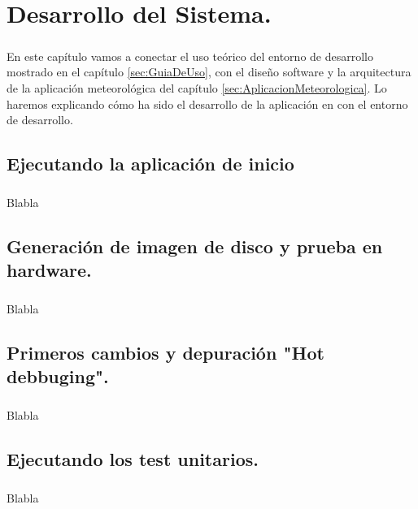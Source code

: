 \chapter{Desarrollo del Sistema.}\label{sec:Desarrollo}

\paragraph{}En este capítulo vamos a conectar el uso teórico del entorno de desarrollo
mostrado en el capítulo \ref{sec:GuiaDeUso}, con el diseño software y la arquitectura de
la aplicación meteorológica del capítulo \ref{sec:AplicacionMeteorologica}. Lo haremos
explicando cómo ha sido el desarrollo de la aplicación en con el entorno de desarrollo.

\section{Ejecutando la aplicación de inicio}

\paragraph{}Blabla

\section{Generación de imagen de disco y prueba en hardware.}

\paragraph{}Blabla

\section{Primeros cambios y depuración "Hot debbuging".}

\paragraph{}Blabla

\section{Ejecutando los test unitarios.}

\paragraph{}Blabla

